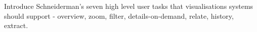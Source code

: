 
Introduce Schneiderman's seven high level user tasks that visualisations systems should support - overview, zoom, filter, details-on-demand, relate, history, extract.


